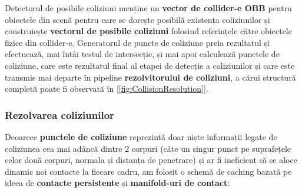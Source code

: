 \documentclass[12pt,a4paper]{report}
\begin{document}
Detectorul de posibile coliziuni menține un \textbf{vector de collider-e OBB} pentru obiectele din scenă pentru care se dorește posibilă existența coliziunilor și construiește \textbf{vectorul de posibile coliziuni} folosind referințele către obiectele fizice din collider-e. Generatorul de puncte de coliziune preia rezultatul și efectuează, mai întâi testul de intersecție, și mai apoi calculează punctele de coliziune, care este rezultatul final al etapei de detecție a coliziunilor și care este transmis mai departe în pipeline \textbf{rezolvitorului de coliziuni}, a cărui structură completă poate fi observată în [\autoref{fig:CollisionResolution}].
\subsubsection{Rezolvarea coliziunilor}
Deoarece \textbf{punctele de coliziune} reprezintă doar niște informații legate de coliziunea cea mai adâncă dintre 2 corpuri (câte un singur punct pe suprafețele celor două corpuri, normala și distanța de penetrare) și ar fi ineficient să se aloce dinamic noi contacte la fiecare cadru, am folosit o schemă de caching bazată pe ideea de \textbf{contacte persistente} și \textbf{manifold-uri de contact}:
\end{document}
